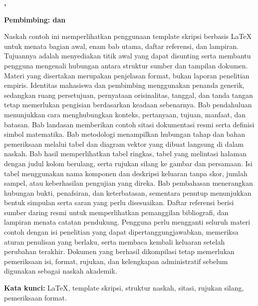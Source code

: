 
\noindent\textbf{\namamahasiswa, \judulskripsi}\par
\noindent\textbf{Pembimbing: \pembimbingsatu{} dan \pembimbingdua}\par
\vspace{\baselineskip}

Naskah contoh ini memperlihatkan penggunaan template skripsi berbasis LaTeX untuk menata bagian awal, enam bab utama, daftar referensi, dan lampiran. Tujuannya adalah menyediakan titik awal yang dapat disunting serta membantu pengguna mengenali hubungan antara struktur sumber dan tampilan dokumen. Materi yang disertakan merupakan penjelasan format, bukan laporan penelitian empiris. Identitas mahasiswa dan pembimbing menggunakan penanda generik, sedangkan ruang persetujuan, pernyataan orisinalitas, tanggal, dan tanda tangan tetap memerlukan pengisian berdasarkan keadaan sebenarnya. Bab pendahuluan menunjukkan cara menghubungkan konteks, pertanyaan, tujuan, manfaat, dan batasan. Bab landasan memberikan contoh sitasi dokumentasi resmi serta definisi simbol matematika. Bab metodologi menampilkan hubungan tahap dan bahan pemeriksaan melalui tabel dan diagram vektor yang dibuat langsung di dalam naskah. Bab hasil memperlihatkan tabel ringkas, tabel yang melintasi halaman dengan judul kolom berulang, serta rujukan silang ke gambar dan persamaan. Isi tabel menggunakan nama komponen dan deskripsi keluaran tanpa skor, jumlah sampel, atau keberhasilan pengujian yang direka. Bab pembahasan menerangkan hubungan bukti, penafsiran, dan keterbatasan, sementara penutup menunjukkan bentuk simpulan serta saran yang perlu disesuaikan. Daftar referensi berisi sumber daring resmi untuk memperlihatkan pemanggilan bibliografi, dan lampiran menata catatan pendukung. Pengguna perlu mengganti seluruh materi contoh dengan isi penelitian yang dapat dipertanggungjawabkan, memeriksa aturan penulisan yang berlaku, serta membaca kembali keluaran setelah perubahan terakhir. Dokumen yang berhasil dikompilasi tetap memerlukan pemeriksaan isi, format, rujukan, dan kelengkapan administratif sebelum digunakan sebagai naskah akademik.

\noindent\textbf{Kata kunci:} LaTeX, template skripsi, struktur naskah, sitasi, rujukan silang, pemeriksaan format.
